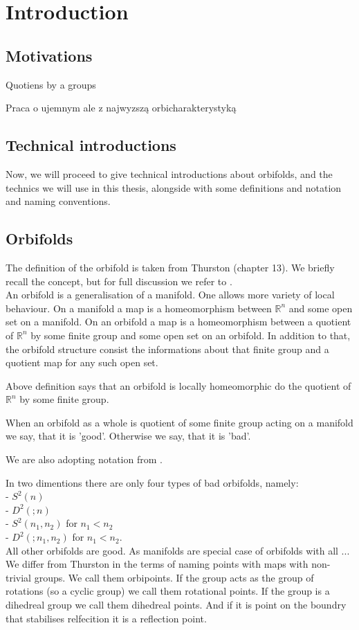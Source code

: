 \chapter{Introduction}
\setcounter{page}{8}
\section{Motivations}
Quotiens by a groups

Praca o ujemnym ale z najwyzszą orbicharakterystyką

\section{Technical introductions}
Now, we will proceed to give technical introductions about orbifolds, \Eoc and the 
technics we will use in this thesis, alongside with some definitions and notation and 
naming conventions.  
\section{Orbifolds}
The definition of the orbifold is taken from Thurston \cite{Thurston1979} (chapter 13). 
We briefly recall the concept, but for full discussion we refer to \cite{Thurston1979}. \\
An orbifold is a generalisation of a manifold. One allows more variety of local behaviour. 
On a manifold a map is a homeomorphism between $\mathbb{R}^n$ and some open set on a manifold. 
On an orbifold a map is a homeomorphism between a quotient of $\mathbb{R}^n$ by some 
finite group and some open set on an orbifold. 
In addition to that, the orbifold structure consist the informations about that finite group 
and a quotient map for any such open set. 

Above definition says that an orbifold is locally homeomorphic do the quotient of $\mathbb{R}^n$ 
by some finite group. 

When an orbifold as a whole is quotient of some finite group acting on a manifold we say, that 
it is 'good'. Otherwise we say, that it is 'bad'. 

We are also adopting notation from \cite{Thurston1979}. 

In two dimentions there are only four types of bad orbifolds, namely: \\
- $S^2(n)$ \\
- $D^2(;n)$ \\
- $S^2(n_1,n_2)$ for $n_1 < n_2$ \\
- $D^2(;n_1,n_2)$ for $n_1 < n_2$. \\
All other orbifolds are good.
As manifolds are special case of orbifolds with all ...
We differ from Thurston in the terms of naming points with maps with non-trivial groups. 
We call them orbipoints. If the group acts as the group of rotations (so a 
cyclic group) we call them rotational points. If the group is a dihedreal group we call them 
dihedreal points. And if it is point on the boundry that stabilises relfecition it is a 
reflection point.

